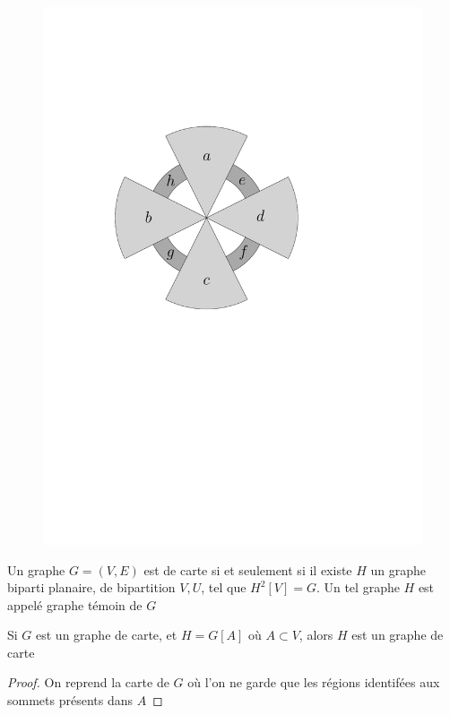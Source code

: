 \documentclass{scrartcl}
\begin{document}
\begin{flushleft}
\begin{figure}[h]
\begin{center}
    \includegraphics*[page=\ipeFigfirsttemoin, scale = 0.38]{figs}
    \end{center}
\end{figure}

\begin{theorem}\label{carCarte}
    Un graphe $G = (V, E)$ est de carte si et seulement si il existe $H$ un graphe biparti planaire, de bipartition $V, U$,
    tel que $H^2[V] = G$. Un tel graphe $H$ est appelé graphe témoin de $G$
\end{theorem}

\begin{prop}
    Si $G$ est un graphe de carte, et $H = G[A]$ où $A \subset V$, alors $H$ est un graphe de carte
\end{prop}

\begin{proof}
    On reprend la carte de $G$ où l'on ne garde que les régions identifées aux sommets présents dans $A$
\end{proof}


\end{flushleft}
\end{document}
